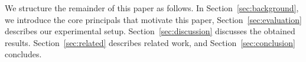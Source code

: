 \documentclass[10pt,sigconf,anonymous]{acmart}
\newcommand{\todo}[1]{\textbf{\textcolor{red}{To do: #1}}}
\begin{document}
We structure the remainder of this paper as follows. In Section~\ref{sec:background}, we introduce the core principals that motivate this paper, Section~\ref{sec:evaluation} describes our experimental setup. Section~\ref{sec:discussion} discusses the obtained results. Section~\ref{sec:related} describes related work, and Section~\ref{sec:conclusion} concludes.

















\end{document}
